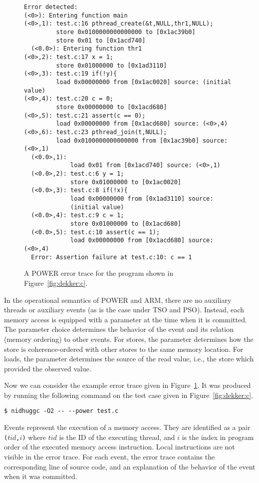 \documentclass[a4paper]{article}
\begin{document}
\begin{figure}
\begin{verbatim}
Error detected:
(<0>): Entering function main
(<0>,1): test.c:16 pthread_create(&t,NULL,thr1,NULL);
         store 0x0100000000000000 to [0x1ac39b0]
         store 0x01 to [0x1acd740]
  (<0.0>): Entering function thr1
(<0>,2): test.c:17 x = 1;
         store 0x01000000 to [0x1ad3110]
(<0>,3): test.c:19 if(!y){
         load 0x00000000 from [0x1ac0020] source: (initial value)
(<0>,4): test.c:20 c = 0;
         store 0x00000000 to [0x1acd680]
(<0>,5): test.c:21 assert(c == 0);
         load 0x00000000 from [0x1acd680] source: (<0>,4)
(<0>,6): test.c:23 pthread_join(t,NULL);
         load 0x0100000000000000 from [0x1ac39b0] source: (<0>,1)
  (<0.0>,1):
             load 0x01 from [0x1acd740] source: (<0>,1)
  (<0.0>,2): test.c:6 y = 1;
             store 0x01000000 to [0x1ac0020]
  (<0.0>,3): test.c:8 if(!x){
             load 0x00000000 from [0x1ad3110] source:
             (initial value)
  (<0.0>,4): test.c:9 c = 1;
             store 0x01000000 to [0x1acd680]
  (<0.0>,5): test.c:10 assert(c == 1);
             load 0x00000000 from [0x1acd680] source: (<0>,4)
  Error: Assertion failure at test.c:10: c == 1
\end{verbatim}
\caption{A POWER error trace for the program shown in Figure~\ref{fig:dekker:c}.}\label{fig:ex:error:trace:dekker:power}
\end{figure}

In the operational semantics of POWER and ARM, there are no auxiliary
threads or auxiliary events (as is the case under TSO and
PSO). Instead, each memory access is equipped with a parameter at the
time when it is committed. The parameter choice determines the
behavior of the event and its relation (memory ordering) to other
events. For stores, the parameter determines how the store is
coherence-ordered with other stores to the same memory location. For
loads, the parameter determines the source of the read value, i.e.,
the store which provided the observed value.

Now we can consider the example error trace given in
Figure~\ref{fig:ex:error:trace:dekker:power}. It was produced by
running the following command on the test case given in
Figure~\ref{fig:dekker:c}.

\noindent
\begin{verbatim}
$ nidhuggc -O2 -- --power test.c
\end{verbatim}

\noindent
Events represent the execution of a memory access. They are identified
as a pair \texttt{($tid$,$i$)} where $tid$ is the ID of the executing
thread, and $i$ is the index in program order of the executed memory
access instruction. Local instructions are not visible in the error
trace. For each event, the error trace contains the corresponding line
of source code, and an explanation of the behavior of the event when
it was committed.
\end{document}

